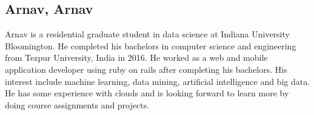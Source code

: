 \subsection{Arnav, Arnav}

Arnav is a residential graduate student in data science at Indiana
University Bloomington.  He completed his bachelors in computer
science and engineering from Tezpur University, India in 2016.  He
worked as a web and mobile application developer using ruby on rails
after completing his bachelors.  His interest include machine
learning, data mining, artificial intelligence and big data.  He has
some experience with clouds and is looking forward to learn more by
doing course assignments and projects.

